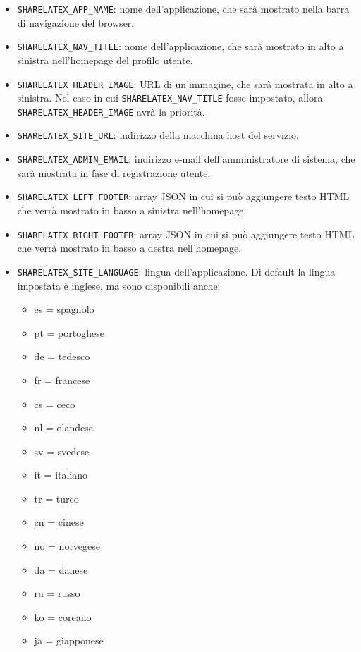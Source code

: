 \begin{itemize}
    \item \verb|SHARELATEX_APP_NAME|: nome dell'applicazione, che sarà mostrato nella barra di navigazione del browser.
    \item \verb|SHARELATEX_NAV_TITLE|: nome dell'applicazione, che sarà mostrato in alto a sinistra nell'homepage del profilo utente.
    \item \verb|SHARELATEX_HEADER_IMAGE|: URL di un'immagine, che sarà mostrata in alto a sinistra. Nel caso in cui \verb|SHARELATEX_NAV_TITLE| fosse impostato, allora\\\verb|SHARELATEX_HEADER_IMAGE| avrà la priorità.
    \item \verb|SHARELATEX_SITE_URL|: indirizzo della macchina host del servizio.
    \item \verb|SHARELATEX_ADMIN_EMAIL|: indirizzo e-mail dell'amministratore di sistema, che sarà mostrata in fase di registrazione utente.
    \item \verb|SHARELATEX_LEFT_FOOTER|: array JSON in cui si può aggiungere testo HTML che verrà mostrato in basso a sinistra nell'homepage.
    \item \verb|SHARELATEX_RIGHT_FOOTER|: array JSON in cui si può aggiungere testo HTML che verrà mostrato in basso a destra nell'homepage.
    \item \verb|SHARELATEX_SITE_LANGUAGE|: lingua dell'applicazione. Di default la lingua impostata è inglese, ma sono disponibili anche:
        \begin{multicols}{3}
            \begin{itemize}
                \item es = spagnolo
                \item pt = portoghese
                \item de = tedesco
                \item fr = francese
                \item cs = ceco
                \item nl = olandese
                \item sv = svedese
                \item it = italiano
                \item tr = turco
                \item cn = cinese
                \item no = norvegese
                \item da = danese
                \item ru = russo
                \item ko = coreano
                \item ja = giapponese
            \end{itemize}
        \end{multicols}
\end{itemize}

